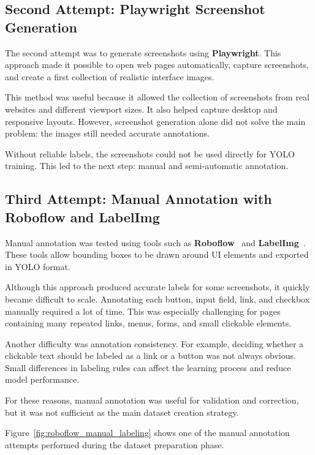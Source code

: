 \subsection{Second Attempt: Playwright Screenshot Generation}
\label{subsec:playwright_generation}

The second attempt was to generate screenshots using \textbf{Playwright}. This approach made it possible to open web pages automatically, capture screenshots, and create a first collection of realistic interface images.

This method was useful because it allowed the collection of screenshots from real websites and different viewport sizes. It also helped capture desktop and responsive layouts. However, screenshot generation alone did not solve the main problem: the images still needed accurate annotations.

Without reliable labels, the screenshots could not be used directly for YOLO training. This led to the next step: manual and semi-automatic annotation.



\subsection{Third Attempt: Manual Annotation with Roboflow and LabelImg}
\label{subsec:manual_annotation}

Manual annotation was tested using tools such as \textbf{Roboflow}~\cite{roboflow_docs} and \textbf{LabelImg}~\cite{labelimg_repository}. These tools allow bounding boxes to be drawn around UI elements and exported in YOLO format.

Although this approach produced accurate labels for some screenshots, it quickly became difficult to scale. Annotating each button, input field, link, and checkbox manually required a lot of time. This was especially challenging for pages containing many repeated links, menus, forms, and small clickable elements.

Another difficulty was annotation consistency. For example, deciding whether a clickable text should be labeled as a link or a button was not always obvious. Small differences in labeling rules can affect the learning process and reduce model performance.

For these reasons, manual annotation was useful for validation and correction, but it was not sufficient as the main dataset creation strategy.

Figure~\ref{fig:roboflow_manual_labeling} shows one of the manual annotation attempts performed during the dataset preparation phase.


